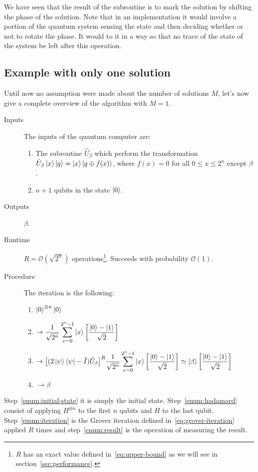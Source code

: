 We have seen that the result of the subroutine is to mark the solution by shifting the phase of the solution. Note that in an implementation it would involve a portion of the quantum system sensing the state and then deciding whether or not to rotate the phase. It would to it in a way so that no trace of the state of the system be left after this operation.
\subsection{Example with only one solution}
Until now no assumption were made about the number of solutions $M$, let's now give a complete overview of the algorithm with $M=1$.
\begin{description}
   \item[Inputs] The inputs of the quantum computer are:
    \begin{enumerate}
  \item The subroutine $\hat{U}_\beta$ which perform the transformation $\hat{U}_\beta\ket{x}\ket{q} = \ket{x}\ket{q \oplus f(x)}$, where $f(x) = 0$ for all $0 \leq x \leq 2^n$ except $\beta$.
  \item $n+1$ qubits in the state $\ket{0}$.
\end{enumerate}
   \item[Outputs] $\beta$.
   \item[Runtime] $R = \mathcal{O}(\sqrt{2^n})$ operations\footnote{$R$ has an exact value defined in~\ref{eq:upper-bound} as we will see in section~\ref{sec:performance}.}. Succeeds with probability $\mathcal{O}(1)$.
   \item[Procedure] The iteration is the following:
   \begin{enumerate}
  \item $\ket{0}^{\otimes n} \ket{0}$ \label{enum:initial-state}
  \item $\begin{aligned} \rightarrow \frac{1}{\sqrt{2^n}} \sum_{x=0}^{2^n-1}\ket{x} \biggl[\frac{\ket{0}-\ket{1}}{\sqrt{2}}\biggr] \end{aligned}$ \label{enum:hadamard}
  \item $\begin{aligned} \rightarrow \bigl[(2 \ket{\psi}\bra{\psi} - \hat{I})\hat{U}_\beta\bigr]^R \frac{1}{\sqrt{2^n}} \sum_{x=0}^{2^n-1}\ket{x} \biggl[\frac{\ket{0}-\ket{1}}{\sqrt{2}}\biggr] \simeq \ket{\beta} \biggl[\frac{\ket{0}-\ket{1}}{\sqrt{2}}\biggr] \end{aligned}$ \label{enum:iteration}
  \item $\rightarrow \beta$ \label{enum:result}
\end{enumerate}
\end{description}

Step~\ref{enum:initial-state} it is simply the initial state. Step~\ref{enum:hadamard} consist of applying $H^{\otimes n}$ to the first $n$ qubits and $H$ to the last qubit. Step~\ref{enum:iteration} is the Grover iteration defined in~\ref{eq:grover-iteration} applied $R$ times and step~\ref{enum:result} is the operation of measuring the result.


